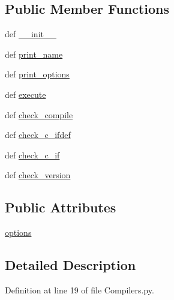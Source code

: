 \subsection*{Public Member Functions}
\begin{DoxyCompactItemize}
\item 
def \hyperlink{classCompilers_1_1Compilers_a401d7750736badfcabbcdd39909109c7}{\-\_\-\-\_\-init\-\_\-\-\_\-}
\item 
def \hyperlink{classCompilers_1_1Compilers_aabd91a4eeb39804bbddba7c5bb1b6ec0}{print\-\_\-name}
\item 
def \hyperlink{classCompilers_1_1Compilers_a152a2bd6caf05098ebdfd2e336c1f71b}{print\-\_\-options}
\item 
def \hyperlink{classCompilers_1_1Compilers_a85044d54e6b66cb5f29328a75f5bf446}{execute}
\item 
def \hyperlink{classCompilers_1_1Compilers_aac1f107915d98d9b076c68a7ebc2ec48}{check\-\_\-compile}
\item 
def \hyperlink{classCompilers_1_1Compilers_a82b789e14047fa9d8027c9df59c95dca}{check\-\_\-c\-\_\-ifdef}
\item 
def \hyperlink{classCompilers_1_1Compilers_a5a8137663ccef6cb4a82c2636d93ce3b}{check\-\_\-c\-\_\-if}
\item 
def \hyperlink{classCompilers_1_1Compilers_a3a65f6da74cda8747cfc7af58ad2e1ee}{check\-\_\-version}
\end{DoxyCompactItemize}
\subsection*{Public Attributes}
\begin{DoxyCompactItemize}
\item 
\hyperlink{classCompilers_1_1Compilers_a29d4fb86feaa70cccd5d6b8852421767}{options}
\end{DoxyCompactItemize}


\subsection{Detailed Description}


Definition at line 19 of file Compilers.\-py.



